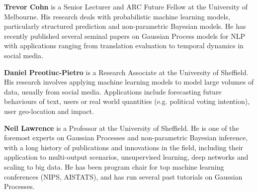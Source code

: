 \begin{bio}
  {\bfseries Trevor Cohn} is a Senior Lecturer and ARC Future Fellow at the University of
  Melbourne. His research deals with probabilistic machine learning models, particularly structured
  prediction and non-parametric Bayesian models. He has recently published several seminal papers on
  Gaussian Process models for NLP with applications ranging from translation evaluation to temporal
  dynamics in social media.

  {\bfseries Daniel Preotiuc-Pietro} is a Research Associate at the University of Sheffield. His
  research involves applying machine learning models to model large volumes of data, usually from
  social media. Applications include forecasting future behaviours of text, users or real world
  quantities (e.g. political voting intention), user geo-location and impact.

  {\bfseries Neil Lawrence} is a Professor at the University of Sheffield. He is one of the foremost
  experts on Gaussian Processes and non-parametric Bayesian inference, with a long history of
  publications and innovations in the field, including their application to multi-output scenarios,
  unsupervised learning, deep networks and scaling to big data. He has been program chair for top
  machine learning conferences (NIPS, AISTATS), and has run several past tutorials on Gaussian
  Processes.

\end{bio}

